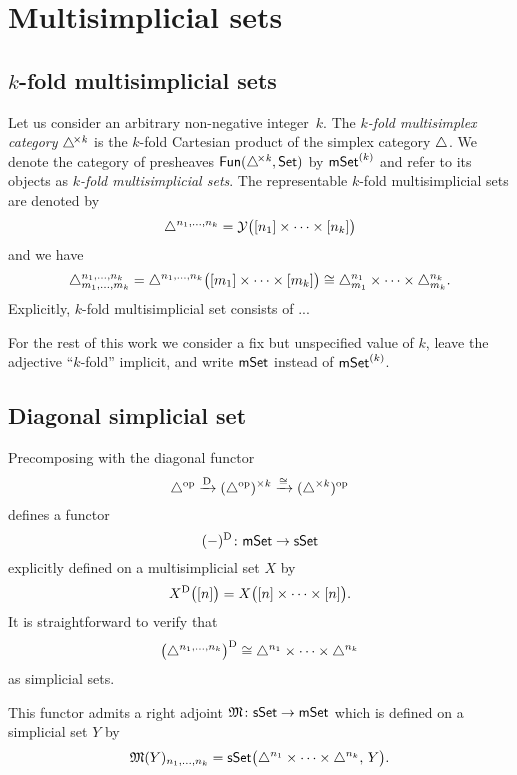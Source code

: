 
\section{Multisimplicial sets}

\subsection{$k$-fold multisimplicial sets}

Let us consider an arbitrary non-negative integer~$k$.
The \textit{$k$-fold multisimplex category} $\triangle^{\!\times\mathit{k}}$ is the $k$-fold Cartesian product of the simplex category $\triangle$.
We denote the category of presheaves $\mathsf{Fun}(\triangle^{\!\times\mathit{k}}, \mathsf{Set})$ by $\mathsf{mSet}^{(k)}$ and refer to its objects as \textit{$k$-fold multisimplicial sets}.
The representable $k$-fold multisimplicial sets are denoted by
\[
\triangle^{n_1, \dots, n_k} = \mathcal{Y} \big( [n_1] \times \cdots \times [n_k] \big)
\]
and we have
\[
\triangle^{n_1, \dots, n_k}_{m_1, \dots, m_k} =
\triangle^{n_1, \dots, n_k} \big( [m_1] \times \cdots \times [m_k] \big) \cong
\triangle^{n_1}_{m_1} \times \dots \times \triangle^{n_k}_{m_k}.
\]
Explicitly, $k$-fold multisimplicial set consists of ...


\begin{convention}
	For the rest of this work we consider a fix but unspecified value of $k$, leave the adjective ``$k$-fold'' implicit, and write $\mathsf{mSet}$ instead of $\mathsf{mSet}^{(k)}$.
\end{convention}

\subsection{Diagonal simplicial set} \label{ss:diagonal simplicial set}

Precomposing with the diagonal functor
\[
\triangle^{\mathrm{op}} \xrightarrow{\operatorname{D}}
(\triangle^{\mathrm{op}})^{\times k} \xrightarrow{\cong}
(\triangle^{\times k})^{\mathrm{op}}
\]
defines a functor
\[
(-)^{\operatorname{D}} \colon \mathsf{mSet} \to \mathsf{sSet}
\]
explicitly defined on a multisimplicial set $X$ by
\[
X^{\operatorname{D}} \big( [n] \big) = X \big( [n] \times \dots \times [n] \big).
\]
It is straightforward to verify that
\[
\big( \triangle^{n_1, \dots, n_k} \big)^{\operatorname{D}} \cong
\triangle^{n_1} \times \dots \times \triangle^{n_k}
\]
as simplicial sets.

This functor admits a right adjoint $\operatorname{\mathfrak{M}} \colon \mathsf{sSet} \to \mathsf{mSet}$ which is defined on a simplicial set $Y$ by
\[
\operatorname{\mathfrak{M}}(Y)_{n_1, \dots, n_k} =
\mathsf{sSet}\big( \triangle^{n_1} \times \dots \times \triangle^{n_k}, \, Y \big).
\]

